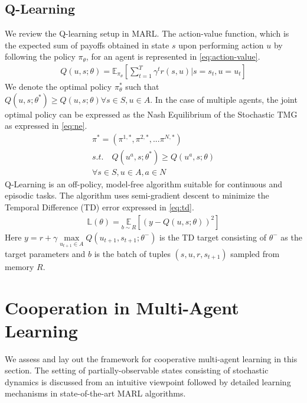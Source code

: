 \documentclass{article}
\begin{document}
\begin{multicols}{2}
\subsection{Q-Learning}
We review the Q-learning setup in MARL. The action-value function, which is the expected sum of payoffs obtained in state $s$ upon performing action $u$ by following the policy $\pi_{\theta}$, for an agent is represented in \autoref{eq:action-value}.
\begin{gather}
  Q(u,s;\theta) = \mathbb{E}_{\pi_{\theta}}[\sum_{t=1}^{T}\gamma^{t}r(s,u)|s=s_{t},u=u_{t}] \label{eq:action-value}
\end{gather}
We denote the optimal policy $\pi_{\theta}^{*}$ such that $Q(u,s;\theta^{*}) \geq Q(u,s;\theta) \forall s \in S, u \in A$. In the case of multiple agents, the joint optimal policy can be expressed as the Nash Equilibrium \cite{nash} of the Stochastic TMG as expressed in \autoref{eq:ne}. 
\begin{multline}
  \pi^{*} = (\pi^{1,*},\pi^{2,*}, ...\pi^{N,*})\\ s.t.\quad Q(u^{a},s;\theta^{*}) \geq Q(u^{a},s;\theta)\\ \forall s \in S, u \in A, a \in N \label{eq:ne}  
\end{multline}
Q-Learning is an off-policy, model-free algorithm suitable for continuous and episodic tasks. The algorithm uses semi-gradient descent to minimize the Temporal Difference (TD) error expressed in \autoref{eq:td}.
\begin{gather}
  \mathbb{L(\theta)} = \underset{b \sim R}{\mathbb{E}}[(y - Q(u,s;\theta))^{2}] \label{eq:td}
\end{gather}
Here $y = r + \gamma \underset{u_{t+1}\in A}{\max} Q(u_{t+1},s_{t+1};\theta^{-})$ is the TD target consisting of $\theta^{-}$ as the target parameters and $b$ is the batch of tuples $(s,u,r,s_{t+1})$ sampled from memory $R$.


\section{Cooperation in Multi-Agent Learning}
We assess and lay out the framework for cooperative multi-agent learning in this section. The setting of partially-observable states consisting of stochastic dynamics is discussed from an intuitive viewpoint followed by detailed learning mechanisms in state-of-the-art MARL algorithms.  


\end{multicols}
\end{document}
